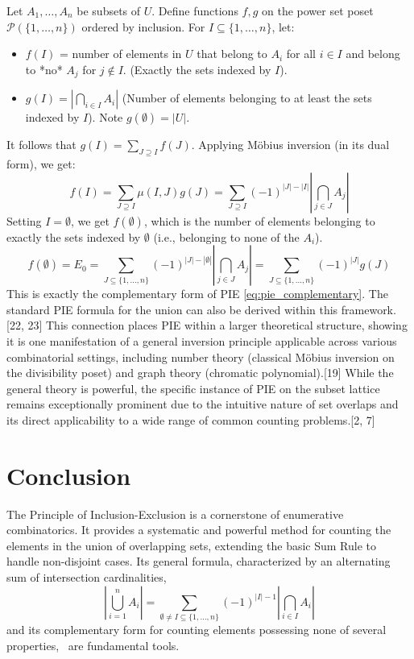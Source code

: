 \documentclass[11pt]{amsart}
\theoremstyle{plain}
\theoremstyle{definition}
\theoremstyle{remark}
\begin{document}
Let $A_1, \ldots, A_n$ be subsets of $U$. Define functions $f, g$ on the power set poset $\mathcal{P}(\{1, \ldots, n\})$ ordered by inclusion. For $I \subseteq \{1, \ldots, n\}$, let:
\begin{itemize}
    \item $f(I)$ = number of elements in $U$ that belong to $A_i$ for all $i \in I$ and belong to *no* $A_j$ for $j \notin I$. (Exactly the sets indexed by $I$).
    \item $g(I) = \left| \bigcap_{i \in I} A_i \right|$ (Number of elements belonging to at least the sets indexed by $I$). Note $g(\emptyset) = |U|$.
\end{itemize}
It follows that $g(I) = \sum_{J \supseteq I} f(J)$. Applying M\"obius inversion (in its dual form), we get:
\[ f(I) = \sum_{J \supseteq I} \mu(I, J) g(J) = \sum_{J \supseteq I} (-1)^{|J|-|I|} \left| \bigcap_{j \in J} A_j \right| \]
Setting $I = \emptyset$, we get $f(\emptyset)$, which is the number of elements belonging to exactly the sets indexed by $\emptyset$ (i.e., belonging to none of the $A_i$).
\[ f(\emptyset) = E_0 = \sum_{J \subseteq \{1, \ldots, n\}} (-1)^{|J|-|\emptyset|} \left| \bigcap_{j \in J} A_j \right| = \sum_{J \subseteq \{1, \ldots, n\}} (-1)^{|J|} g(J) \]
This is exactly the complementary form of PIE \eqref{eq:pie_complementary}. The standard PIE formula for the union can also be derived within this framework.[22, 23] This connection places PIE within a larger theoretical structure, showing it is one manifestation of a general inversion principle applicable across various combinatorial settings, including number theory (classical M\"obius inversion on the divisibility poset) and graph theory (chromatic polynomial).[19] While the general theory is powerful, the specific instance of PIE on the subset lattice remains exceptionally prominent due to the intuitive nature of set overlaps and its direct applicability to a wide range of common counting problems.[2, 7]

\section{Conclusion}
The Principle of Inclusion-Exclusion is a cornerstone of enumerative combinatorics. It provides a systematic and powerful method for counting the elements in the union of overlapping sets, extending the basic Sum Rule to handle non-disjoint cases. Its general formula, characterized by an alternating sum of intersection cardinalities,
\[ \left| \bigcup_{i=1}^n A_i \right| = \sum_{\emptyset \neq I \subseteq \{1, \ldots, n\}} (-1)^{|I|-1} \left| \bigcap_{i \in I} A_i \right| \]
and its complementary form for counting elements possessing none of several properties,
\
are fundamental tools.
\end{document}

